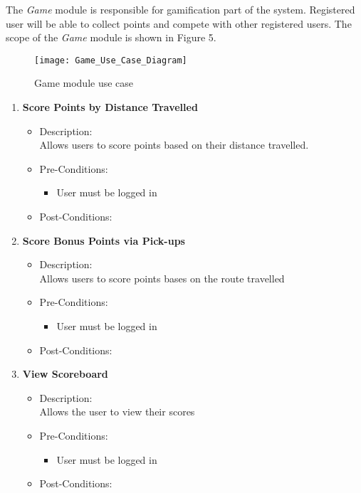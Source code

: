 The \textit{Game} module is responsible for gamification part of the system. Registered user will be able to collect points and compete with other registered users. The scope of the \textit{Game} module is shown in Figure 5.  \\[1cm]

\begin{figure}[h]
	\texttt{[image: Game\_Use\_Case\_Diagram]}
	\caption{Game module use case}
\end{figure}

\begin{enumerate}
	\item \textbf{Score Points by Distance Travelled}
	\begin{itemize}
		\item Description: \\
		Allows users to score points based on their distance travelled.
		\item Pre-Conditions: \\
		\begin{itemize}
		\item User must be logged in
		
		\end{itemize}
		
		\item Post-Conditions: \\
	
	\end{itemize}
	
	\item \textbf{Score Bonus Points via Pick-ups}
	\begin{itemize}
		\item Description: \\
		Allows users to score points bases on the route travelled
		\item Pre-Conditions: \\
		\begin{itemize}
		\item User must be logged in
		
		\end{itemize}
		
		\item Post-Conditions: \\
	
	\end{itemize}
	
	\item \textbf{View Scoreboard}
	\begin{itemize}
		\item Description: \\
		Allows the user to view their scores
		\item Pre-Conditions: \\
		\begin{itemize}
		\item User must be logged in		
		\end{itemize}
		\item Post-Conditions: \\
	
	\end{itemize}
	
	
\end{enumerate}